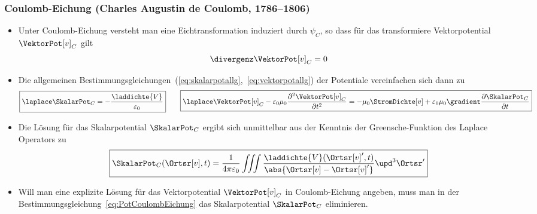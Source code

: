   \begin{frame}
  \frametitle{Coulomb-Eichung (Charles Augustin de Coulomb, 1786--1806)}
  \begin{itemize}[<+->]
  \item Unter \alert{Coulomb-Eichung} versteht man eine Eichtransformation induziert durch $\psi_C$, so dass für das transformiere Vektorpotential $\VektorPot[v]_C$ gilt
    \begin{equation}
      \divergenz\VektorPot[v]_C = 0
      \label{eq:CoulombEichung}
    \end{equation}
  \item Die allgemeinen Bestimmungsgleichungen~(\ref{eq:skalarpotallg},~\ref{eq:vektorpotallg}) der Potentiale vereinfachen sich dann zu
    \begin{equation}
      \boxed{\laplace \SkalarPot_C = -\frac{\laddichte{V}}{\varepsilon_0}} \quad\quad \boxed{\laplace\VektorPot[v]_C -\varepsilon_0 \mu_0\frac{\partial^2\VektorPot[v]_C}{\partial t^2} = -\mu_0\StromDichte[v] +\varepsilon_0\mu_0 \gradient\frac{\partial\SkalarPot_C}{\partial t}} 
      \label{eq:PotCoulombEichung}
    \end{equation}
  \item Die Lösung für das Skalarpotential $\SkalarPot_C$ ergibt sich unmittelbar aus der Kenntnis der Greensche-Funktion des Laplace Operators zu
    \begin{equation}
      \boxed{\SkalarPot_C (\Ortsr[v], t) = \frac{1}{4\pi\varepsilon_0} \iiint \frac{\laddichte{V}(\Ortsr[v]^\prime, t)}{\abs{\Ortsr[v]-\Ortsr[v]^\prime}} \upd^3\Ortsr^\prime}
      \label{eq:SkPotC}
    \end{equation}
    \item Will man eine explizite Lösung für das Vektorpotential $\VektorPot[v]_C$ in Coulomb-Eichung angeben, muss man in der Bestimmungsgleichung~\eqref{eq:PotCoulombEichung} das Skalarpotential $\SkalarPot_C$ eliminieren.
    \end{itemize}

    \ 
  \end{frame}
    
